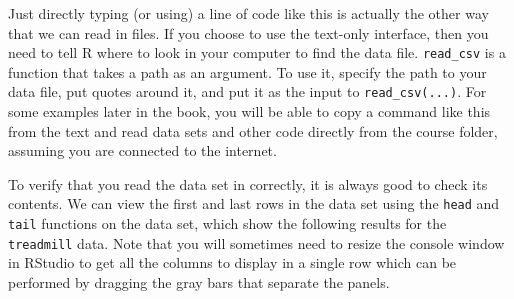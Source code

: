 \documentclass[]{book}
\renewcommand{\indent}{\hspace{15pt}}
\begin{document}
\indent Just directly typing (or using) a line of code like this is actually the
other way that we can read in
files. If you choose to use the text-only interface, then you need to tell R
where to look in your computer to find the data file. \texttt{read\_csv} is a
function that takes a path as an argument. To use it, specify the path to
your data file, put quotes around it, and put it as the input to
\texttt{read\_csv(...)}. For some examples later in the book, you will be able to
copy a command like this from the text and read data sets and other
code directly from the course folder, assuming you are connected to the
internet.

\indent To verify that you read the data set in correctly, it is always good to check
its contents. We can view the first and last rows in the data set using the
\texttt{head} and \texttt{tail} functions on the data set, which show the following
results for the
\texttt{treadmill} data. Note that you will sometimes need to resize the console
window in RStudio to get all the columns to display
in a single row which can be performed by dragging the gray bars that separate
the panels.

\small
\end{document}
